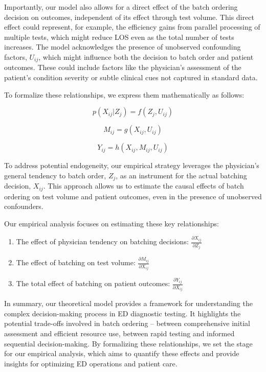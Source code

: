 \documentclass{article}
\begin{document}
Importantly, our model also allows for a direct effect of the batch
ordering decision on outcomes, independent of its effect through test
volume. This direct effect could represent, for example, the efficiency
gains from parallel processing of multiple tests, which might reduce LOS
even as the total number of tests increases. The model acknowledges the
presence of unobserved confounding factors, \(U_{ij}\), which might
influence both the decision to batch order and patient outcomes. These
could include factors like the physician's assessment of the patient's
condition severity or subtle clinical cues not captured in standard
data.

To formalize these relationships, we express them mathematically as
follows:

\begin{equation}
p(X_{ij}|Z_j) = f(Z_j, U_{ij})
\end{equation}

\begin{equation}
M_{ij} = g(X_{ij}, U_{ij})
\end{equation}

\begin{equation}
Y_{ij} = h(X_{ij}, M_{ij}, U_{ij})
\end{equation}

To address potential endogeneity, our empirical strategy leverages the
physician's general tendency to batch order, \(Z_j\), as an instrument
for the actual batching decision, \(X_{ij}\). This approach allows us to
estimate the causal effects of batch ordering on test volume and patient
outcomes, even in the presence of unobserved confounders.

Our empirical analysis focuses on estimating these key relationships:

\begin{enumerate}
  \item The effect of physician tendency on batching decisions: $\frac{\partial X_{ij}}{\partial Z_j}$
  \item The effect of batching on test volume: $\frac{\partial M_{ij}}{\partial X_{ij}}$
  \item The total effect of batching on patient outcomes: $\frac{\partial Y_{ij}}{\partial X_{ij}}$
\end{enumerate}

In summary, our theoretical model provides a framework for understanding
the complex decision-making process in ED diagnostic testing. It
highlights the potential trade-offs involved in batch ordering --
between comprehensive initial assessment and efficient resource use,
between rapid testing and informed sequential decision-making. By
formalizing these relationships, we set the stage for our empirical
analysis, which aims to quantify these effects and provide insights for
optimizing ED operations and patient care.
\end{document}

